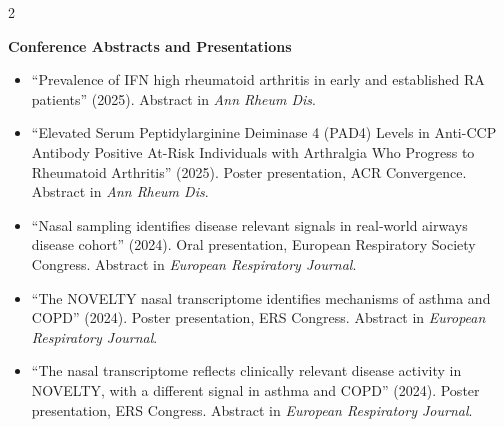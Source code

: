\documentclass[letterpaper,11pt]{article}
\begin{document}
\begin{paracol}{2}
\begin{rightcolumn}
\textbf{Conference Abstracts and Presentations}
\begin{itemize}
    \item “Prevalence of IFN high rheumatoid arthritis in early and established RA patients” (2025). Abstract in \textit{Ann Rheum Dis}.
    \item “Elevated Serum Peptidylarginine Deiminase 4 (PAD4) Levels in Anti-CCP Antibody Positive At-Risk Individuals with Arthralgia Who Progress to Rheumatoid Arthritis” (2025). Poster presentation, ACR Convergence. Abstract in \textit{Ann Rheum Dis}.
    \item “Nasal sampling identifies disease relevant signals in real-world airways disease cohort” (2024). Oral presentation, European Respiratory Society Congress. Abstract in \textit{European Respiratory Journal}.
    \item “The NOVELTY nasal transcriptome identifies mechanisms of asthma and COPD” (2024). Poster presentation, ERS Congress. Abstract in \textit{European Respiratory Journal}.
    \item “The nasal transcriptome reflects clinically relevant disease activity in NOVELTY, with a different signal in asthma and COPD” (2024). Poster presentation, ERS Congress. Abstract in \textit{European Respiratory Journal}.
\end{itemize}

\end{rightcolumn}
\end{paracol}
\end{document}
